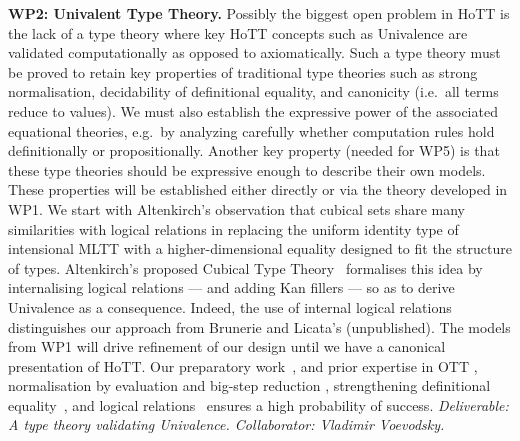 \documentclass[a4paper,11pt]{article}
\begin{document}
{\bf WP2: Univalent Type Theory.}  Possibly the biggest open problem
in HoTT is the lack of a type theory where key HoTT concepts
such as Univalence are validated computationally as opposed to axiomatically. Such a type theory must be proved to retain key
properties of traditional type theories such as strong normalisation,
decidability of definitional equality, and canonicity ({i.e.}~all
terms reduce to values). We must also establish the expressive power
of the associated equational theories, {e.g.}~by analyzing carefully
whether computation rules hold definitionally or
propositionally. Another key property (needed for WP5) is that these
type theories should be expressive enough to describe their own
models. These properties will be established either directly or via the theory
developed in WP1. We start with Altenkirch's observation \cite{txa-ihp14} that cubical
sets share many similarities with logical relations in replacing the
uniform identity type of intensional MLTT with a higher-dimensional
equality designed to fit the structure of types. Altenkirch's proposed
Cubical Type Theory~\cite{alti-ctt} formalises this idea by internalising logical
relations --- and adding Kan fillers --- so as to derive Univalence as a consequence. Indeed, the use
of internal logical relations distinguishes our approach from Brunerie
and Licata's (unpublished).  The models from WP1 will drive refinement of our design
until we have a canonical presentation of HoTT. Our preparatory
work~\cite{txa-ihp14,alti-ctt}, and prior expertise in OTT
\cite{alti:ott-conf}, normalisation by evaluation and big-step
reduction \cite{alti:lics96}, %
strengthening definitional
equality~\cite{Allais:2013:NEN:2502409.2502411}, and logical
relations~\cite{neil2014relParamDep} ensures a high probability of
success.  {\em Deliverable: A
  type theory validating Univalence.  Collaborator: Vladimir
  Voevodsky.  } 
\end{document}
